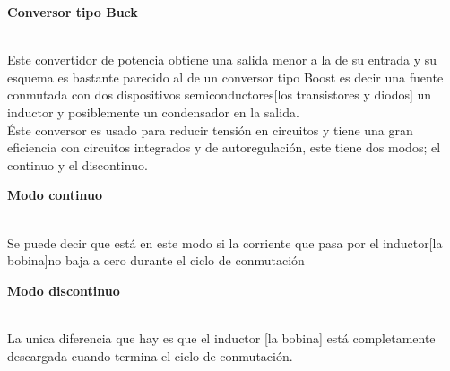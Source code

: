 \documentclass[a3paper,12pt]{article}
\begin{document}
{\begin{flushleft}
\begin{LARGE}
	\vspace{1cm}

	\pagebreak
	\begin{huge}
	\textbf{Conversor tipo Buck}
	\end{huge}\\
	Este convertidor de potencia obtiene una salida menor a la de su entrada y su esquema es bastante parecido al de un conversor tipo Boost es decir una fuente conmutada con dos dispositivos semiconductores[los transistores y diodos] un inductor y posiblemente un condensador en la salida.\\
	Éste conversor es usado para reducir tensión en circuitos y tiene una gran eficiencia con circuitos integrados y de autoregulación, este tiene dos modos; el continuo y el discontinuo.\\
	\vspace{1.3cm}
	
	
	
	\hspace{3cm}\begin{huge} \textbf{Modo continuo}	\end{huge}\\
	Se puede decir que está en este modo si la corriente que pasa por el inductor[la bobina]no baja a cero durante el ciclo de conmutación	\\
	\vspace{1cm}
	\hspace{3cm}\begin{huge} \textbf{Modo discontinuo}	\end{huge}\\
	La unica diferencia que hay es que el inductor [la bobina] está completamente descargada cuando termina el ciclo de conmutación.\\
	
	
\end{LARGE}

\vspace{2cm}










\end{flushleft}}
\end{document}

